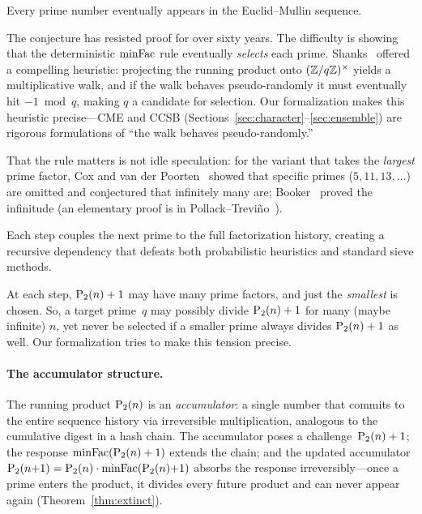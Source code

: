 \begin{conjecture}[Mullin, 1963]\label{conj:mullin}
Every prime number eventually appears in the Euclid--Mullin sequence.
\end{conjecture}

The conjecture has resisted proof for over sixty years.  The difficulty
is showing that the deterministic $\mathrm{minFac}$ rule eventually \emph{selects} each prime.
Shanks~\cite{Shanks1991} offered a compelling heuristic: projecting the
running product onto $(\mathbb{Z}/q\mathbb{Z})^\times$ yields a multiplicative walk,
and if the walk behaves pseudo-randomly it must eventually hit $-1
\bmod q$, making $q$ a candidate for selection.  Our formalization
makes this heuristic precise---CME and CCSB
(Sections~\ref{sec:character}--\ref{sec:ensemble}) are rigorous
formulations of ``the walk behaves pseudo-randomly.''

That the rule matters is not idle speculation: for the variant that takes
the \emph{largest} prime factor, Cox and van der
Poorten~\cite{CoxVdP1968} showed that specific primes ($5, 11, 13, \dots$)
are omitted and conjectured that infinitely many are; Booker~\cite{Booker2012}
proved the infinitude (an elementary proof is in
Pollack--Trevi\~no~\cite{PollackTrevino2014}).

Each step couples the next prime to the full factorization history, creating a recursive dependency that
defeats both probabilistic heuristics and standard sieve methods.

At each step, $\mathrm{P}_{2}(n)+1$ may have many prime factors, and just the \emph{smallest} is chosen.
So, a target prime~$q$ may possibly divide $\mathrm{P}_{2}(n)+1$ for many (maybe infinite) $n$,
yet never be selected if a smaller prime always divides $\mathrm{P}_{2}(n)+1$ as well.
Our formalization tries to make this tension precise.

\paragraph{The accumulator structure.}
The running product $\mathrm{P}_{2}(n)$ is an \emph{accumulator}: a single
number that commits to the entire sequence history via irreversible
multiplication, analogous to the cumulative digest in a hash chain.
The accumulator poses a challenge~$\mathrm{P}_{2}(n)+1$; the response
$\mathrm{minFac}(\mathrm{P}_{2}(n)+1)$ extends the chain; and the updated accumulator
$\mathrm{P}_{2}(n{+}1) = \mathrm{P}_{2}(n) \cdot \mathrm{minFac}(\mathrm{P}_{2}(n){+}1)$ absorbs the
response irreversibly---once a prime enters the product, it divides
every future product and can never appear again
(Theorem~\ref{thm:extinct}).

